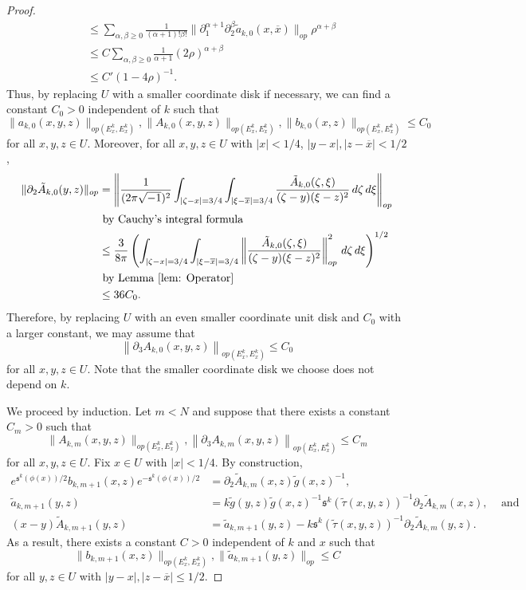 \documentclass{amsart}
\theoremstyle{definition}
\theoremstyle{remark}
\numberwithin{equation}{section}
\begin{document}
\begin{proof}
\begin{align*}
    & \leq \sum_{\alpha,\beta \geq 0} \frac{1}{(\alpha+1)!\beta!}\|\partial_1^{\alpha+1} \partial_2^\beta \tilde{a}_{k,0}(x,\overline{x})\|_{op} \rho^{\alpha+\beta} \\
    &\leq C \sum_{\alpha,\beta \geq 0} \frac{1}{\alpha+1} (2\rho)^{\alpha+\beta} \\
    & \leq C' (1-4\rho)^{-1}.
\end{align*}
Thus, by replacing $U$ with a smaller coordinate disk if necessary, we can find a constant $C_0 > 0$ independent of $k$ such that
$$
\|a_{k,0}(x,y,z)\|_{op(E^k_x, E^k_x)} ,
\|A_{k,0}(x,y,z)\|_{op(E^k_x, E^k_x)},
\|b_{k,0}(x,z)\|_{op(E^k_x, E^k_x)} \leq C_0
$$
for all $x,y,z \in U$. Moreover, for all $x, y,z \in U$ with $|x| < 1/4$, $|y-x|, |z-\overline{x}| < 1/2$,
\begin{align*}
\|\partial_2 \tilde{A}_{k,0}(y,z)\|_{op} & = \left \|\frac{1}{(2\pi \sqrt{-1})^2} \int_{|\zeta-x|=3/4} \int_{|\xi-\overline{x}|=3/4} \frac{\tilde{A}_{k,0}(\zeta,\xi)}{(\zeta -y) (\xi-z)^2} \,d\zeta\,d\xi \right \|_{op} \\
    & \text{ by Cauchy's integral formula} \\
    & \leq \frac{3}{8\pi}  \left ( \int_{|\zeta-x|=3/4} \int_{|\xi-\overline{x}|=3/4} \left \| \frac{\tilde{A}_{k,0}(\zeta,\xi)}{(\zeta -y) (\xi-z)^{2}}\right \|_{op}^2  \,d\zeta\,d\xi \right)^{1/2} \\
    & \text{ by Lemma \ref{lem: Operator}} \\
    & \leq 36 C_0.
\end{align*}
Therefore, by replacing $U$ with an even smaller coordinate unit disk and $C_0$ with a larger constant, we may assume that
$$
\left \| \partial_3 A_{k,0}(x,y,z) \right \|_{op(E^k_x,E^k_x)} \leq C_0
$$
for all $x,y,z \in U$. Note that the smaller coordinate disk we choose does not depend on $k$.

We proceed by induction. Let $m < N$ and suppose that there exists a constant $C_m > 0$ such that 
$$
\|A_{k,m}(x,y,z)\|_{op(E^k_x,E^k_x)}, \left \| \partial_3 A_{k,m}(x,y,z) \right \|_{op(E^k_x,E^k_x)} \leq C_m
$$
for all $x,y,z \in U$. Fix $x \in U$ with $|x| < 1/4$. By construction,
\begin{align*}
e^{\mathfrak{s}^k(\phi(x))/2} b_{k,m+1}(x,z) e^{-\mathfrak{s}^k(\phi(x))/2} & =  \partial_2 \tilde{A}_{k,m}(x,z) \tilde{g}(x,z)^{-1}, \\
\tilde{a}_{k,m+1}(y,z) & = k \tilde{g}(y,z)\tilde{g}(x,z)^{-1} \mathfrak{s}^k(\tilde{\tau}(x,y,z))^{-1} \partial_2 \tilde{A}_{k,m}(x,z), \hspace{10pt} \text{ and } \\
(x-y)\tilde{A}_{k,m+1}(y,z) & = \tilde{a}_{k,m+1}(y,z) - k \mathfrak{s}^k(\tilde{\tau}(x,y,z))^{-1} \partial_2 \tilde{A}_{k,m}(y,z).
\end{align*}
As a result, there exists a constant $C > 0$ independent of $k$ and $x$ such that
$$
\| b_{k,m+1}(x,z)\|_{op(E^k_x,E^k_x)}, \|\tilde{a}_{k,m+1}(y,z)\|_{op} \leq C
$$
for all $y,z \in U$ with $|y-x|,|z-\overline{x}| \leq 1/2$.





\end{proof}
\end{document}
